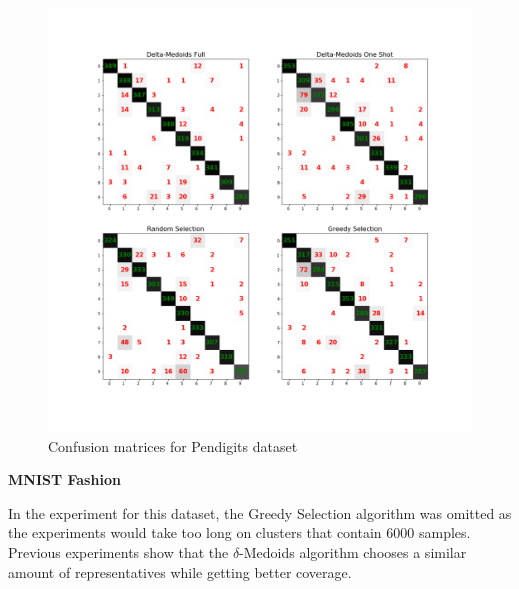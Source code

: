 \documentclass[thesis=B,english]{FITthesis}[2012/10/20]
\begin{document}
\begin{figure}[t]
   \includegraphics[width=\linewidth]{img/exp3_pendigits.png}
  \caption{Confusion matrices for Pendigits dataset}
  \label{img:exp3_pendigits}
\end{figure}

\textbf{MNIST Fashion}

In the experiment for this dataset, the Greedy Selection algorithm was omitted as the experiments would take too long on clusters that contain 6000 samples.
Previous experiments show that the $\delta$-Medoids algorithm chooses a similar amount of representatives while getting better coverage.
\end{document}
